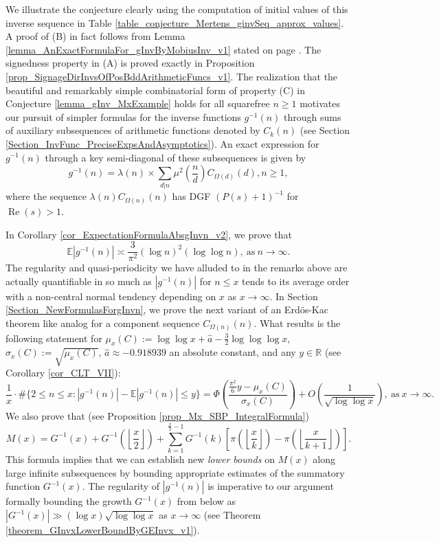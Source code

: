 \documentclass[11pt,reqno,a4letter]{article}
\numberwithin{figure}{section}
\numberwithin{table}{section}
\newcommand{\Floor}[2]{\ensuremath{\left\lfloor \frac{#1}{#2} \right\rfloor}}
\theoremstyle{plain}
\numberwithin{theorem}{section}
\theoremstyle{definition}
\renewcommand{\Re}{\operatorname{Re}}
\begin{document}
We illustrate the conjecture clearly using the computation of initial values of 
this inverse sequence in 
Table \ref{table_conjecture_Mertens_ginvSeq_approx_values}. 
A proof of (B) in fact follows from 
Lemma \ref{lemma_AnExactFormulaFor_gInvByMobiusInv_v1} 
stated on page \pageref{lemma_AnExactFormulaFor_gInvByMobiusInv_v1}. 
The signedness property in (A) is proved exactly in 
Proposition \ref{prop_SignageDirInvsOfPosBddArithmeticFuncs_v1}. 
The realization that the beautiful and remarkably simple combinatorial form of property (C) 
in Conjecture \ref{lemma_gInv_MxExample} holds for all squarefree $n \geq 1$ 
motivates our pursuit of simpler formulas for the inverse functions $g^{-1}(n)$ 
through sums of auxiliary subsequences of arithmetic functions denoted by $C_k(n)$  
(see Section \ref{Section_InvFunc_PreciseExpsAndAsymptotics}). 
An exact expression for $g^{-1}(n)$ through a key semi-diagonal of these subsequences 
is given by 
\[
g^{-1}(n) = \lambda(n) \times \sum_{d|n} \mu^2\left(\frac{n}{d}\right) C_{\Omega(d)}(d), n \geq 1,  
\]
where the sequence $\lambda(n) C_{\Omega(n)}(n)$ has DGF $(P(s)+1)^{-1}$ for $\Re(s) > 1$. 

In Corollary \ref{cor_ExpectationFormulaAbsgInvn_v2}, we prove that 
\[
\mathbb{E}|g^{-1}(n)| \asymp \frac{3}{\pi^2} (\log n)^2 (\log\log n), 
     \mathrm{\ as\ } n \rightarrow \infty. 
\]
The regularity and quasi-periodicity we have alluded to in the remarks above are actually 
quantifiable in so much as $|g^{-1}(n)|$ for $n \leq x$ 
tends to its average order with a non-central normal tendency 
depending on $x$ as $x \rightarrow \infty$. 
In Section \ref{Section_NewFormulasForgInvn}, 
we prove the next variant of an Erd\"os-Kac theorem like analog
for a component sequence $C_{\Omega(n)}(n)$. 
What results is the following statement for 
$\mu_x(C) := \log\log x + \hat{a} - \frac{3}{2}\log\log\log x$, $\sigma_x(C) := \sqrt{\mu_x(C)}$, 
$\hat{a} \approx -0.918939$ an absolute constant, and any $y \in \mathbb{R}$ (see 
Corollary \ref{cor_CLT_VII}): 
\[
\frac{1}{x} \cdot \#\{2 \leq n \leq x: |g^{-1}(n)| - \mathbb{E}|g^{-1}(n)| \leq y\} = 
     \Phi\left(\frac{\frac{\pi^2}{6}y - \mu_x(C)}{\sigma_x(C)}\right) + 
     O\left(\frac{1}{\sqrt{\log\log x}}\right), 
     \mathrm{\ as\ } x \rightarrow \infty. 
\]
We also prove that (see Proposition \ref{prop_Mx_SBP_IntegralFormula}) 
\begin{equation} 
\label{eqn_Mx_gInvnPixk_formula_v2} 
M(x) = G^{-1}(x) + G^{-1}\left(\Floor{x}{2}\right) + 
     \sum_{k=1}^{\frac{x}{2}-1} G^{-1}(k) \left[ 
     \pi\left(\Floor{x}{k}\right) - \pi\left(\Floor{x}{k+1}\right) 
     \right]. 
\end{equation} 
This formula 
implies that we can establish new \emph{lower bounds} on $M(x)$ along large infinite subsequences 
by bounding appropriate estimates of the summatory function $G^{-1}(x)$. 
The regularity of $|g^{-1}(n)|$ is imperative to our argument formally bounding the growth 
$G^{-1}(x)$ from below as $|G^{-1}(x)| \gg (\log x) \sqrt{\log\log x}$ as $x \rightarrow \infty$ 
(see Theorem \ref{theorem_GInvxLowerBoundByGEInvx_v1}). 
\end{document}
